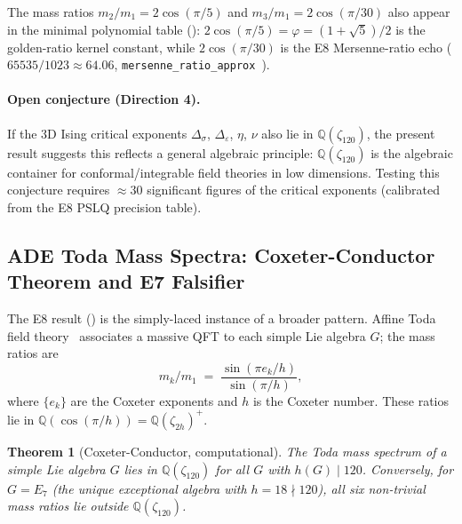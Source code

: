 \documentclass[11pt]{article}
\newtheorem{theorem}{Theorem}[section]
\theoremstyle{remark}
\newcommand{\zetaN}[1]{\zeta_{#1}}
\newcommand{\PHI}{\varphi}
\begin{document}
The mass ratios $m_2/m_1 = 2\cos(\pi/5)$ and $m_3/m_1 = 2\cos(\pi/30)$ also
appear in the minimal polynomial table ():
$2\cos(\pi/5) = \PHI = (1+\sqrt{5})/2$ is the golden-ratio kernel constant,
while $2\cos(\pi/30)$ is the E8 Mersenne-ratio echo
($65535/1023 \approx 64.06$, \texttt{mersenne\_ratio\_approx}~\cite{ugp-lean}).

\paragraph{Open conjecture (Direction 4).}
If the 3D Ising critical exponents $\Delta_\sigma$, $\Delta_\varepsilon$,
$\eta$, $\nu$ also lie in $\mathbb{Q}(\zetaN{120})$, the present result suggests
this reflects a general algebraic principle: $\mathbb{Q}(\zetaN{120})$ is the
algebraic container for conformal/integrable field theories in low dimensions.
Testing this conjecture requires $\approx 30$ significant figures of the critical
exponents (calibrated from the E8 PSLQ precision table).

\subsection{ADE Toda Mass Spectra: Coxeter-Conductor Theorem and E7 Falsifier}
\label{sec:coxeter_conductor}

The E8 result () is the simply-laced instance of a broader
pattern.  Affine Toda field theory~\cite{Corrigan1994} associates a massive QFT to
each simple Lie algebra $G$; the mass ratios are
\[
  m_k/m_1 \;=\; \frac{\sin(\pi e_k/h)}{\sin(\pi/h)},
\]
where $\{e_k\}$ are the Coxeter exponents and $h$ is the Coxeter number.
These ratios lie in $\mathbb{Q}(\cos(\pi/h)) = \mathbb{Q}(\zeta_{2h})^+$.

\begin{theorem}[Coxeter-Conductor, computational]
\label{thm:coxeter_conductor}
The Toda mass spectrum of a simple Lie algebra $G$ lies in
$\mathbb{Q}(\zetaN{120})$ for all $G$ with $h(G) \mid 120$.
Conversely, for $G = E_7$ (the unique exceptional algebra with
$h = 18 \nmid 120$), all six non-trivial mass ratios lie outside
$\mathbb{Q}(\zetaN{120})$.
\end{theorem}
\end{document}
